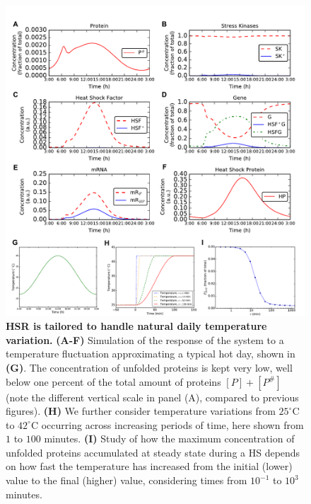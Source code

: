 \documentclass[oneside, 10pt, a4paper, twocolumn]{article}
\begin{document}
\begin{figure}
\centering
\includegraphics[width=\textwidth]{Figure4_Paper.pdf}
\caption{\small{\textbf{HSR is {tailored to handle} natural daily temperature variation.} \textbf{(A-F)} Simulation of the response of the system to a temperature {fluctuation approximating a typical hot day}, shown in \textbf{(G)}. The concentration of unfolded proteins is kept very low, well below one percent of the total amount of proteins $\left[P\right]+\left[P^\#\right]$ (note the different vertical scale in panel (A), compared to previous figures). {\textbf{(H)} We further consider temperature variations from $25^\circ\text{C}$ to $42^\circ\text{C}$ occurring across increasing periods of time, here shown from $1$ to $100$ minutes. \textbf{(I)} Study of how the maximum concentration of unfolded proteins accumulated at steady state during a HS depends on how fast the temperature has increased from the initial (lower) value to the final (higher) value, considering times from $10^{-1}$ to $10^{3}$ minutes.}}
}
\label{Figure4label}
\end{figure}
\end{document}
